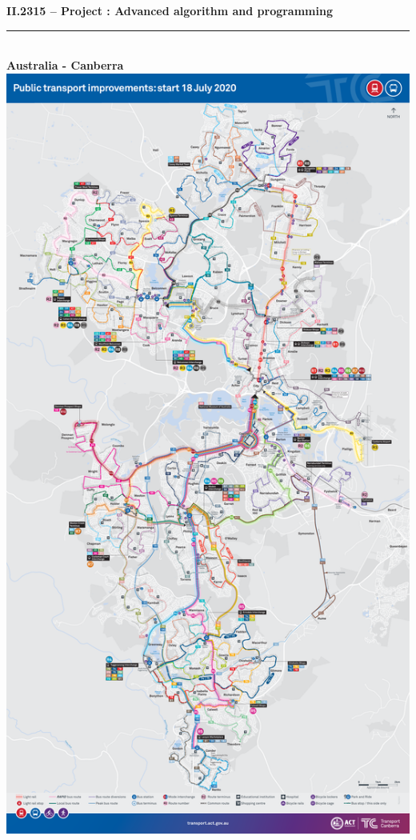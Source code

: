 \documentclass{article}
\begin{document}
\begin{titlepage}
	\begin{center}
		\huge{\bfseries II.2315 – Project : Advanced algorithm and programming} \\
		\rule{16cm}{0.4pt} \\
		\huge{\bfseries Australia - Canberra} \\
		\vspace{3mm}
		\includegraphics[scale=0.20]{assets/CanberraMap}

\end{center}
\end{titlepage}
\end{document}
